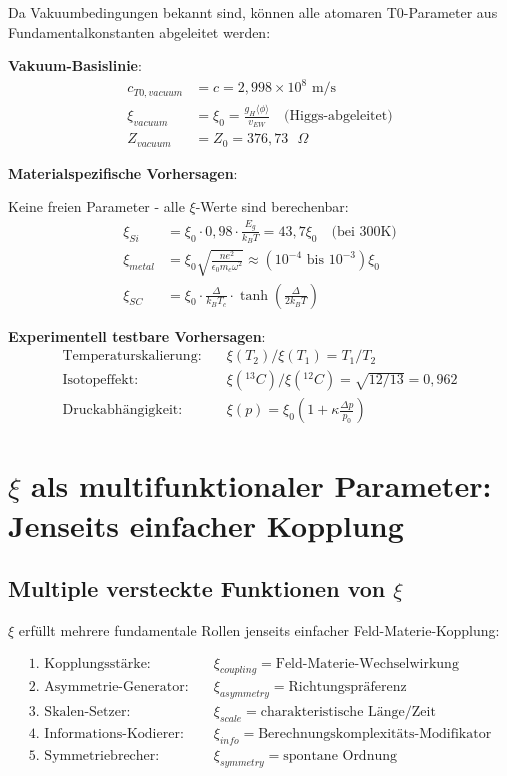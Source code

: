 \documentclass[12pt,a4paper]{article}
\newcommand{\xipar}{\xi}
\begin{document}
	Da Vakuumbedingungen bekannt sind, können alle atomaren T0-Parameter aus Fundamentalkonstanten abgeleitet werden:
	
	\textbf{Vakuum-Basislinie}:
	\begin{align}
		c_{T0,vacuum} &= c = 2,998 \times 10^8 \text{ m/s} \\
		\xipar_{vacuum} &= \xipar_0 = \frac{g_H \langle\phi\rangle}{v_{EW}} \quad \text{(Higgs-abgeleitet)} \\
		Z_{vacuum} &= Z_0 = 376,73 \text{ $\Omega$}
	\end{align}
	
	\textbf{Materialspezifische Vorhersagen}:
	
	Keine freien Parameter - alle $\xipar$-Werte sind berechenbar:
	\begin{align}
		\xipar_{Si} &= \xipar_0 \cdot 0,98 \cdot \frac{E_g}{k_B T} = 43,7 \xipar_0 \quad \text{(bei 300K)} \\
		\xipar_{metal} &= \xipar_0 \sqrt{\frac{n e^2}{\epsilon_0 m_e \omega^2}} \approx (10^{-4} \text{ bis } 10^{-3}) \xipar_0 \\
		\xipar_{SC} &= \xipar_0 \cdot \frac{\Delta}{k_B T_c} \cdot \tanh\left(\frac{\Delta}{2k_B T}\right)
	\end{align}
	
	\textbf{Experimentell testbare Vorhersagen}:
	\begin{align}
		\text{Temperaturskalierung}: \quad &\xipar(T_2)/\xipar(T_1) = T_1/T_2 \\
		\text{Isotopeffekt}: \quad &\xipar(^{13}C)/\xipar(^{12}C) = \sqrt{12/13} = 0,962 \\
		\text{Druckabhängigkeit}: \quad &\xipar(p) = \xipar_0 \left(1 + \kappa \frac{\Delta p}{p_0}\right)
	\end{align}
	
	\section{$\xipar$ als multifunktionaler Parameter: Jenseits einfacher Kopplung}
	
	\subsection{Multiple versteckte Funktionen von $\xipar$}
	
	$\xipar$ erfüllt mehrere fundamentale Rollen jenseits einfacher Feld-Materie-Kopplung:
	
	\begin{align}
		\text{1. Kopplungsstärke}: \quad &\xipar_{coupling} = \text{Feld-Materie-Wechselwirkung} \\
		\text{2. Asymmetrie-Generator}: \quad &\xipar_{asymmetry} = \text{Richtungspräferenz} \\
		\text{3. Skalen-Setzer}: \quad &\xipar_{scale} = \text{charakteristische Länge/Zeit} \\
		\text{4. Informations-Kodierer}: \quad &\xipar_{info} = \text{Berechnungskomplexitäts-Modifikator} \\
		\text{5. Symmetriebrecher}: \quad &\xipar_{symmetry} = \text{spontane Ordnung}
	\end{align}
	
\end{document}
